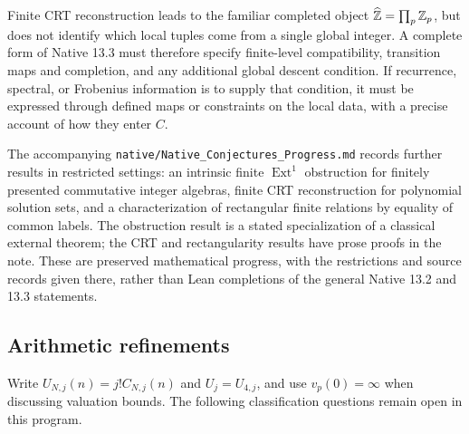Finite CRT reconstruction leads to the familiar completed object
$\widehat{\mathbb Z}=\prod_p\mathbb Z_p$, but does not identify which local tuples come from a
single global integer. A complete form of Native 13.3 must therefore specify
finite-level compatibility, transition maps and completion, and any additional
global descent condition. If recurrence, spectral, or Frobenius information
is to supply that condition, it must be expressed through defined maps or
constraints on the local data, with a precise account of how they enter $C$.

The accompanying \nolinkurl{native/Native_Conjectures_Progress.md} records
further results in restricted settings: an intrinsic finite
$\operatorname{Ext}^1$ obstruction for finitely presented commutative integer
algebras, finite CRT reconstruction for polynomial solution sets, and a
characterization of rectangular finite relations by equality of common
labels. The obstruction result is a stated specialization of a classical
external theorem; the CRT and rectangularity results have prose proofs in
the note. These are preserved mathematical progress, with the restrictions
and source records given there, rather than Lean completions of the general
Native 13.2 and 13.3 statements.

\subsection{Arithmetic refinements}
\label{subsec:arithmetic-open}

Write $U_{N,j}(n)=j!C_{N,j}(n)$ and $U_j=U_{4,j}$, and use
$v_p(0)=\infty$ when discussing valuation bounds. The following classification
questions remain open in this program.

